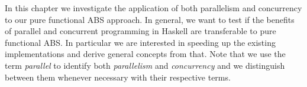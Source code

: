 In this chapter we investigate the application of both parallelism and concurrency to our pure functional ABS approach. In general, we want to test if the benefits of parallel and concurrent programming in Haskell are transferable to pure functional ABS. In particular we are interested in speeding up the existing implementations and derive general concepts from that. Note that we use the term \textit{parallel} to identify both \textit{parallelism} and \textit{concurrency} and we distinguish between them whenever necessary with their respective terms.





